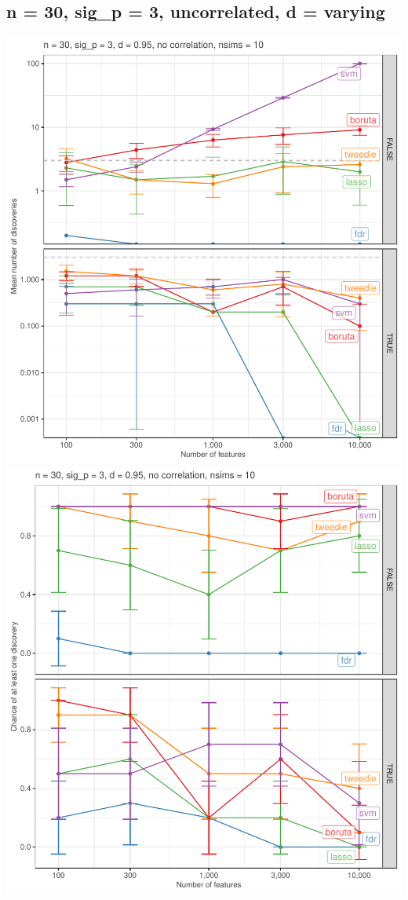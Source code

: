 \documentclass[
]{article}
\begin{document}
\hypertarget{n-30-sig_p-3-uncorrelated-d-varying}{%
\subsection{n = 30, sig\_p = 3, uncorrelated, d = varying}\label{n-30-sig_p-3-uncorrelated-d-varying}}

\begin{center}\includegraphics[width=0.49\linewidth]{main_files/figure-latex/unnamed-chunk-23-1} \includegraphics[width=0.49\linewidth]{main_files/figure-latex/unnamed-chunk-23-2} \end{center}
\end{document}

